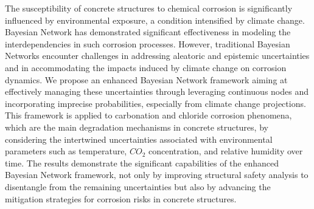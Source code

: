 The susceptibility of concrete structures to chemical corrosion is significantly influenced by environmental exposure, a condition intensified by climate change. 
Bayesian Network has demonstrated significant effectiveness in modeling the interdependencies in such corrosion processes. However, traditional Bayesian Networks encounter challenges in addressing aleatoric and epistemic uncertainties and in accommodating the impacts induced by climate change on corrosion dynamics. We propose an enhanced Bayesian Network framework aiming at effectively managing these uncertainties through leveraging continuous nodes and incorporating imprecise probabilities, especially from climate change projections. This framework is applied to carbonation and chloride corrosion phenomena, which are the main degradation mechanisms in concrete structures, by considering the intertwined uncertainties associated with environmental parameters such as temperature, $CO_2$ concentration, and relative humidity over time. The results demonstrate the significant capabilities of the enhanced Bayesian Network framework, not only by improving structural safety analysis to disentangle from the remaining uncertainties but also by advancing the mitigation strategies for corrosion risks in concrete structures.

